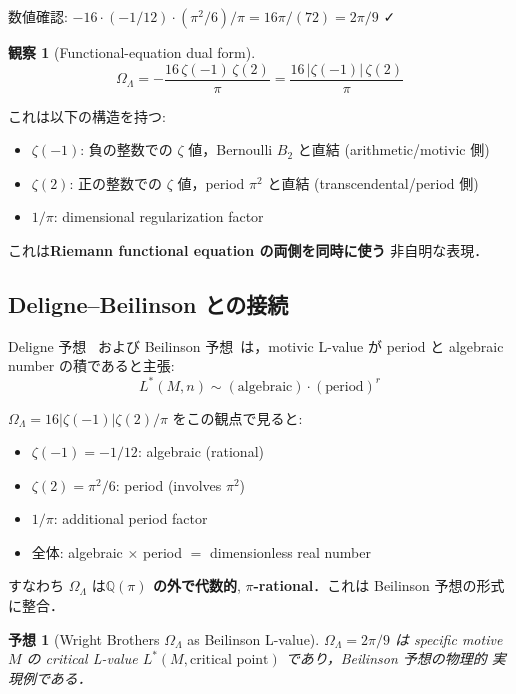 \documentclass[11pt,a4paper]{article}
\newtheorem{observation}{観察}
\newtheorem{conjecture}{予想}
\begin{document}
数値確認: $-16 \cdot (-1/12) \cdot (\pi^2/6)/\pi = 16\pi/(72) = 2\pi/9$ ✓

\begin{observation}[Functional-equation dual form]
\begin{equation}
\boxed{\Omega_\Lambda = -\frac{16\,\zeta(-1)\,\zeta(2)}{\pi} = \frac{16\,|\zeta(-1)|\,\zeta(2)}{\pi}}
\end{equation}
\end{observation}

これは以下の構造を持つ:
\begin{itemize}
\item \textbf{$\zeta(-1)$}: 負の整数での $\zeta$ 値，Bernoulli $B_2$
と直結 (arithmetic/motivic 側)
\item \textbf{$\zeta(2)$}: 正の整数での $\zeta$ 値，period $\pi^2$
と直結 (transcendental/period 側)
\item \textbf{$1/\pi$}: dimensional regularization factor
\end{itemize}

これは\textbf{Riemann functional equation の両側を同時に使う}
非自明な表現．

\subsection{Deligne--Beilinson との接続}

Deligne 予想~\cite{Deligne1979} および Beilinson
予想~\cite{Beilinson1984}は，motivic L-value が period と
algebraic number の積であると主張:
\begin{equation}
L^*(M, n) \sim (\text{algebraic}) \cdot (\text{period})^r
\end{equation}

$\Omega_\Lambda = 16|\zeta(-1)|\zeta(2)/\pi$ をこの観点で見ると:
\begin{itemize}
\item $\zeta(-1) = -1/12$: algebraic (rational)
\item $\zeta(2) = \pi^2/6$: period (involves $\pi^2$)
\item $1/\pi$: additional period factor
\item 全体: algebraic $\times$ period $= $ dimensionless real number
\end{itemize}

すなわち $\Omega_\Lambda$ は\textbf{$\mathbb{Q}(\pi)$ の外で代数的},
\textbf{$\pi$-rational}．これは Beilinson 予想の形式に整合．

\begin{conjecture}[Wright Brothers $\Omega_\Lambda$ as Beilinson L-value]
$\Omega_\Lambda = 2\pi/9$ は specific motive $M$ の critical L-value
$L^*(M, \text{critical point})$ であり，Beilinson 予想の物理的
実現例である．
\end{conjecture}
\end{document}
